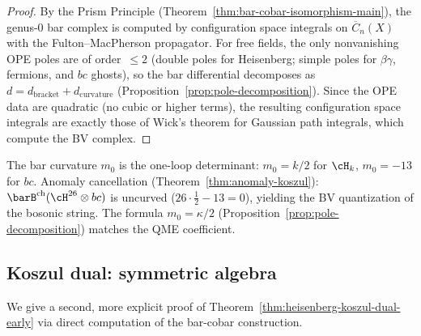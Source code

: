 \begin{proof}
By the Prism Principle (Theorem~\ref{thm:bar-cobar-isomorphism-main}),
the genus-$0$ bar complex is computed by configuration space integrals
on $\overline{C}_n(X)$ with the Fulton--MacPherson propagator.
For free fields, the only nonvanishing OPE poles are of order~$\leq 2$
(double poles for Heisenberg; simple poles for $\beta\gamma$, fermions,
and $bc$ ghosts), so the bar differential decomposes as
$d = d_{\mathrm{bracket}} + d_{\mathrm{curvature}}$
(Proposition~\ref{prop:pole-decomposition}).
Since the OPE data are quadratic (no cubic or higher terms), the
resulting configuration space integrals are exactly those of Wick's theorem
for Gaussian path integrals, which compute the BV complex.
\end{proof}

\begin{remark}
\label{rem:curvature-one-loop}
The bar curvature $m_0$ is the one-loop determinant: $m_0 = k/2$ for $\cH_k$, $m_0 = -13$ for $bc$.  Anomaly cancellation (Theorem~\ref{thm:anomaly-koszul}): $\barB^{\mathrm{ch}}(\cH^{26} \otimes bc)$ is uncurved ($26 \cdot \tfrac{1}{2} - 13 = 0$), yielding the BV quantization of the bosonic string.  The formula $m_0 = \kappa/2$ (Proposition~\ref{prop:pole-decomposition}) matches the QME coefficient.
\end{remark}



\subsection{Koszul dual: symmetric algebra}

We give a second, more explicit proof of Theorem~\ref{thm:heisenberg-koszul-dual-early} via direct computation of the bar-cobar construction.


